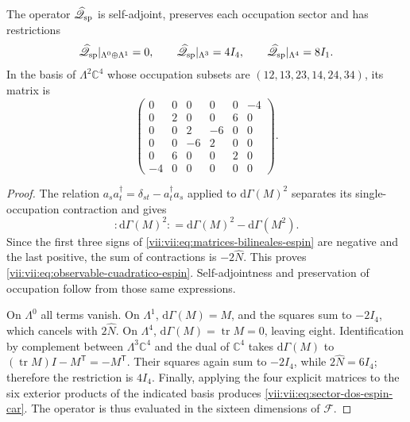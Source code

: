 \begin{proposition}
\label{vii:vii:prop:operador-espin-car}
The operator \(\widehat{\mathscr Q}_{\rm sp}\) is self-adjoint,
preserves each occupation sector and has restrictions
\begin{equation}
 \widehat{\mathscr Q}_{\rm sp}|_{\Lambda^0\oplus\Lambda^1}=0,
 \qquad
 \widehat{\mathscr Q}_{\rm sp}|_{\Lambda^3}=4I_4,
 \qquad
 \widehat{\mathscr Q}_{\rm sp}|_{\Lambda^4}=8I_1.
 \label{vii:vii:eq:sectores-espin-car}
\end{equation}
In the basis of \(\Lambda^2\mathbb C^4\) whose occupation
subsets are \((12,13,23,14,24,34)\), its matrix is
\begin{equation}
 \begin{pmatrix}
 0&0&0&0&0&-4\\
 0&2&0&0&6&0\\
 0&0&2&-6&0&0\\
 0&0&-6&2&0&0\\
 0&6&0&0&2&0\\
 -4&0&0&0&0&0
 \end{pmatrix}.
 \label{vii:vii:eq:sector-dos-espin-car}
\end{equation}
\end{proposition}
\begin{proof}
The relation \(a_s a_t^\dagger=\delta_{st}-a_t^\dagger a_s\)
applied to \(\mathrm d\Gamma(M)^2\) separates its
single-occupation contraction and gives
\[
 :\!\mathrm d\Gamma(M)^2\!:
 =\mathrm d\Gamma(M)^2-\mathrm d\Gamma(M^2).
\]
Since the first three signs of
\eqref{vii:vii:eq:matrices-bilineales-espin} are negative and the last
positive, the sum of contractions is \(-2\widehat N\).
This proves \eqref{vii:vii:eq:observable-cuadratico-espin}.
Self-adjointness and preservation of occupation follow from
those same expressions.

On \(\Lambda^0\) all terms vanish. On \(\Lambda^1\),
\(\mathrm d\Gamma(M)=M\), and the squares sum to \(-2I_4\),
which cancels with \(2\widehat N\). On \(\Lambda^4\),
\(\mathrm d\Gamma(M)=\operatorname{tr}M=0\), leaving eight.
Identification by complement between \(\Lambda^3\mathbb C^4\)
and the dual of \(\mathbb C^4\) takes
\(\mathrm d\Gamma(M)\) to
\((\operatorname{tr}M)I-M^{\mathsf T}=-M^{\mathsf T}\).
Their squares again sum to \(-2I_4\), while
\(2\widehat N=6I_4\); therefore the restriction is \(4I_4\).
Finally, applying the four explicit matrices to the
six exterior products of the indicated basis produces
\eqref{vii:vii:eq:sector-dos-espin-car}. The operator is thus evaluated
in the sixteen dimensions of \(\mathcal F\).
\end{proof}

